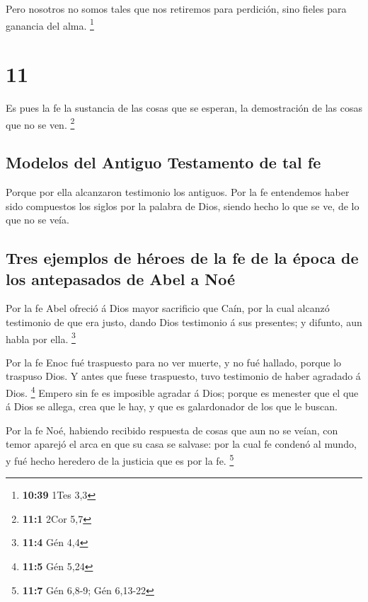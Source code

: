  Pero nosotros no somos tales que nos retiremos para
perdición, sino fieles para ganancia del alma. \footnote{\textbf{10:39}
  1Tes 3,3}

\hypertarget{section-10}{%
\section{11}\label{section-10}}

 Es pues la fe la sustancia de las cosas que se esperan,
la demostración de las cosas que no se ven. \footnote{\textbf{11:1} 2Cor
  5,7}

\hypertarget{modelos-del-antiguo-testamento-de-tal-fe}{%
\subsection{Modelos del Antiguo Testamento de tal
fe}\label{modelos-del-antiguo-testamento-de-tal-fe}}

 Porque por ella alcanzaron testimonio los antiguos.
 Por la fe entendemos haber sido compuestos los siglos por
la palabra de Dios, siendo hecho lo que se ve, de lo que no se veía.

\hypertarget{tres-ejemplos-de-huxe9roes-de-la-fe-de-la-uxe9poca-de-los-antepasados-de-abel-a-nouxe9}{%
\subsection{Tres ejemplos de héroes de la fe de la época de los
antepasados \hspace{0pt}\hspace{0pt}de Abel a
Noé}\label{tres-ejemplos-de-huxe9roes-de-la-fe-de-la-uxe9poca-de-los-antepasados-de-abel-a-nouxe9}}

 Por la fe Abel ofreció á Dios mayor sacrificio que Caín,
por la cual alcanzó testimonio de que era justo, dando Dios testimonio á
sus presentes; y difunto, aun habla por ella. \footnote{\textbf{11:4}
  Gén 4,4}

 Por la fe Enoc fué traspuesto para no ver muerte, y no
fué hallado, porque lo traspuso Dios. Y antes que fuese traspuesto, tuvo
testimonio de haber agradado á Dios. \footnote{\textbf{11:5} Gén 5,24}
 Empero sin fe es imposible agradar á Dios; porque es
menester que el que á Dios se allega, crea que le hay, y que es
galardonador de los que le buscan.

 Por la fe Noé, habiendo recibido respuesta de cosas que
aun no se veían, con temor aparejó el arca en que su casa se salvase:
por la cual fe condenó al mundo, y fué hecho heredero de la justicia que
es por la fe. \footnote{\textbf{11:7} Gén 6,8-9; Gén 6,13-22}

